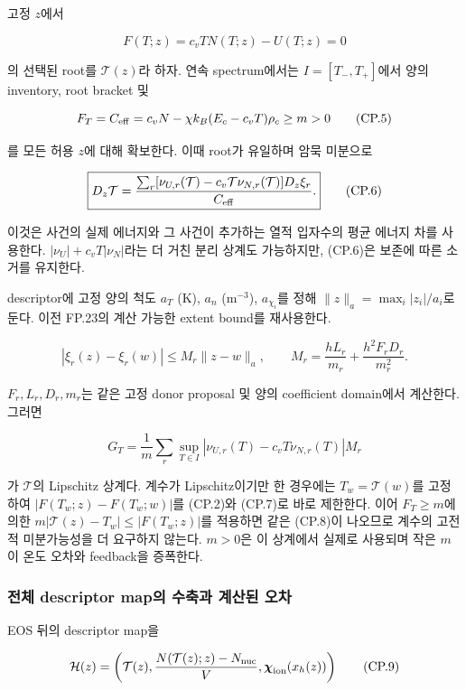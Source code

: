 \documentclass[11pt,a4paper]{article}
\begin{document}
고정 \(z\)에서

\[
F(T;z)=c_vT N(T;z)-U(T;z)=0
\tag{CP.4}
\]

의 선택된 root를 \(\mathcal T(z)\)라 하자. 연속 spectrum에서는 \(I=[T_-,T_+]\)에서 양의 inventory, root bracket 및

\[
F_T=C_{\rm eff}=c_vN-\chi k_B(E_c-c_vT)\rho_c\ge m>0
\tag{CP.5}
\]

를 모든 허용 \(z\)에 대해 확보한다. 이때 root가 유일하며 암묵 미분으로

\[
\boxed{D_z\mathcal T
=\frac{\sum_r[\nu_{U,r}(\mathcal T)-c_v\mathcal T\nu_{N,r}(\mathcal T)]D_z\xi_r}{C_{\rm eff}}.}
\tag{CP.6}
\]

이것은 사건의 실제 에너지와 그 사건이 추가하는 열적 입자수의 평균 에너지 차를 사용한다. \(|\nu_U|+c_vT|\nu_N|\)라는 더 거친 분리 상계도 가능하지만, (CP.6)은 보존에 따른 소거를 유지한다.

descriptor에 고정 양의 척도 \(a_T\) (K), \(a_n\) (\(\mathrm{m^{-3}}\)), \(a_{\chi_i}\)를 정해 \(\|z\|_a=\max_i|z_i|/a_i\)로 둔다. 이전 FP.23의 계산 가능한 extent bound를 재사용한다.

\[
|\xi_r(z)-\xi_r(w)|\le M_r\|z-w\|_a,\qquad
M_r=\frac{hL_r}{m_r}+\frac{h^2F_rD_r}{m_r^2}.
\tag{CP.7}
\]

\(F_r,L_r,D_r,m_r\)는 같은 고정 donor proposal 및 양의 coefficient domain에서 계산한다. 그러면

\[
G_T=\frac1m\sum_r\sup_{T\in I}|\nu_{U,r}(T)-c_vT\nu_{N,r}(T)|M_r
\tag{CP.8}
\]

가 \(\mathcal T\)의 Lipschitz 상계다. 계수가 Lipschitz이기만 한 경우에는 \(T_w=\mathcal T(w)\)를 고정하여 \(|F(T_w;z)-F(T_w;w)|\)를 (CP.2)와 (CP.7)로 바로 제한한다. 이어 \(F_T\ge m\)에 의한 \(m|\mathcal T(z)-T_w|\le |F(T_w;z)|\)를 적용하면 같은 (CP.8)이 나오므로 계수의 고전적 미분가능성을 더 요구하지 않는다. \(m>0\)은 이 상계에서 실제로 사용되며 작은 \(m\)이 온도 오차와 feedback을 증폭한다.

\hypertarget{uxc804uxccb4-descriptor-mapuxc758-uxc218uxcd95uxacfc-uxacc4uxc0b0uxb41c-uxc624uxcc28}{%
\subsubsection{전체 descriptor map의 수축과 계산된 오차}\label{uxc804uxccb4-descriptor-mapuxc758-uxc218uxcd95uxacfc-uxacc4uxc0b0uxb41c-uxc624uxcc28}}

EOS 뒤의 descriptor map을

\[
\mathcal H(z)=\left(\mathcal T(z),\frac{N(\mathcal T(z);z)-N_{\rm nuc}}V,
\boldsymbol\chi_{\rm ion}(x_h(z))\right)
\tag{CP.9}
\]
\end{document}
